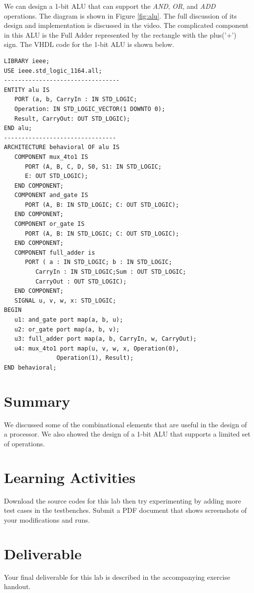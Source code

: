 \documentclass[a4paper, 11pt,oneside]{article}
\begin{document}
We can design a 1-bit ALU that can support the \textit{AND}, \textit{OR}, and \textit{ADD} operations. The diagram is shown in
Figure \ref{fig:alu}. The full discussion of its design and implementation is discussed in the video. The complicated component in this ALU is the Full Adder represented by the rectangle with the plus('+') sign. The VHDL code for the 1-bit ALU is shown below.



\begin{verbatim}
LIBRARY ieee;
USE ieee.std_logic_1164.all;
---------------------------------
ENTITY alu IS
   PORT (a, b, CarryIn : IN STD_LOGIC;
   Operation: IN STD_LOGIC_VECTOR(1 DOWNTO 0);
   Result, CarryOut: OUT STD_LOGIC);
END alu;
--------------------------------
ARCHITECTURE behavioral OF alu IS
   COMPONENT mux_4to1 IS
      PORT (A, B, C, D, S0, S1: IN STD_LOGIC;
      E: OUT STD_LOGIC);
   END COMPONENT;
   COMPONENT and_gate IS
      PORT (A, B: IN STD_LOGIC; C: OUT STD_LOGIC);
   END COMPONENT;
   COMPONENT or_gate IS
      PORT (A, B: IN STD_LOGIC; C: OUT STD_LOGIC);
   END COMPONENT;
   COMPONENT full_adder is
      PORT ( a : IN STD_LOGIC; b : IN STD_LOGIC;
         CarryIn : IN STD_LOGIC;Sum : OUT STD_LOGIC;
         CarryOut : OUT STD_LOGIC);
   END COMPONENT;
   SIGNAL u, v, w, x: STD_LOGIC;
BEGIN
   u1: and_gate port map(a, b, u);
   u2: or_gate port map(a, b, v);
   u3: full_adder port map(a, b, CarryIn, w, CarryOut); 
   u4: mux_4to1 port map(u, v, w, x, Operation(0), 
               Operation(1), Result);
END behavioral;
\end{verbatim}





\section{Summary}
We discussed some of the combinational elements that are useful in the design of a processor. We also showed the design of a 1-bit ALU that supports a limited set of operations.

\section{Learning Activities}
Download the source codes for this lab then try experimenting by adding more test cases in the testbenches. Submit a PDF document that shows screenshots of your modifications and runs.

\section{Deliverable}
Your final deliverable for this lab is described in the accompanying exercise handout.

\end{document}
